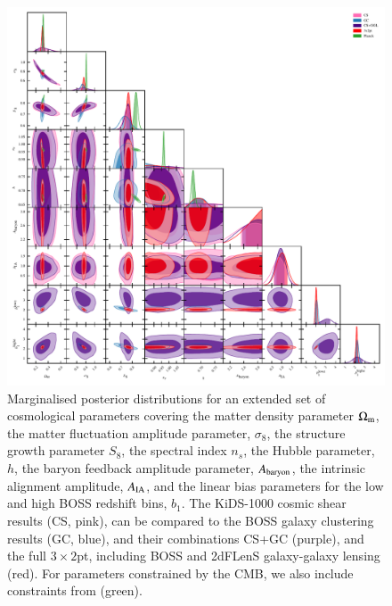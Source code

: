 \begin{figure}
	\begin{center}
		\includegraphics[width=\textwidth]{Parameter_Plots/cosmology/omegam_sigma8_s8_ns_h_a_baryon_a_ia_b1l_b1h_blind_C}
		\caption{Marginalised posterior distributions for an extended set of cosmological parameters covering the matter density parameter $\Omega_{\rm m}$, the matter fluctuation amplitude parameter, $\sigma_8$, the structure growth parameter $S_8$, the spectral index $n_s$, the Hubble parameter, $h$, the baryon feedback amplitude parameter, $A_{\rm baryon}$, the intrinsic alignment amplitude, $A_{\rm IA}$, and the linear bias parameters for the low and high BOSS redshift bins, $b_1$.   The KiDS-1000 cosmic shear results (CS, pink), can be compared to the BOSS galaxy clustering results (GC, blue), and their combinations CS+GC (purple), and the full $3\times2$pt, including BOSS and 2dFLenS galaxy-galaxy lensing (red).   For parameters constrained by the CMB, we also include constraints from \citet{planck/etal:2018} (green).}
		\label{fig:cosmology-params-all}
	\end{center}
\end{figure}

